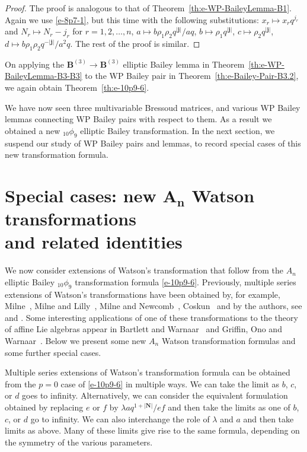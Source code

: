 \documentclass[pdftex]{sigma}
\numberwithin{equation}{section}
\newcommand{\sumN}{{\left| \boldsymbol{N} \right|}}
\newcommand\sumj{{\left| \boldsymbol {j} \right|}}
\newcommand{\B}{{ \mathbf B}}
\begin{document}
\begin{proof}
The proof is analogous to that of Theorem~\ref{th:e-WP-BaileyLemma-B1}. Again we use \eqref{e-8p7-1}, but this time with the following substitutions: $x_r\mapsto x_rq^{j_r}$ and $N_r\mapsto N_r-j_r$ for $r=1, 2, \dots, n$, $a\mapsto b\rho_1\rho_2q^{\sumj}/aq$, $b\mapsto \rho_1q^{\sumj}$, $c\mapsto \rho_2q^{\sumj}$, $d\mapsto b\rho_1\rho_2q^{-\sumj}/a^2q$. The rest of the proof is similar.
\end{proof}

On applying the $\B^{(3)} \to\B^{(3)}$ elliptic Bailey lemma in Theorem~\ref{th:e-WP-BaileyLemma-B3-B3} to the WP Bailey pair in Theorem~\ref{th:e-Bailey-Pair-B3.2}, we again obtain Theorem~\ref{th:e-10p9-6}.

We have now seen three multivariable Bressoud matrices, and various WP Bailey lemmas connecting WP Bailey pairs with respect to them. As a result we obtained a new $_{10}\phi_9$ elliptic Bailey transformation. In the next section, we suspend our study of WP Bailey pairs and lemmas, to record special cases of this new transformation formula.

\section[Special cases: new $A_n$ Watson transformations and related identities]{Special cases: new $\boldsymbol{A_n}$ Watson transformations\\ and related identities}\label{sec:piszero}

We now consider extensions of Watson's transformation that follow from the $A_n$ elliptic Bailey $_{10}\phi_9$ transformation formula \eqref{e-10p9-6}. Previously, multiple series extensions of Watson's transformations have been obtained by, for example, Milne~\cite{Milne1988, Milne1994, Milne2000}, Milne and Lilly~\cite{ML1995}, Milne and Newcomb~\cite{MN1996}, Coskun~\cite{HC2008} and by the authors, see \cite{GB1999a} and \cite{BS1998}. Some interesting applications of one of these transformations to the theory of affine Lie algebras appear in Bartlett and Warnaar~\cite{BW2015} and Griffin, Ono and Warnaar~\cite{GOW2016}.
Below we present some new $A_n$ Watson transformation formulas and some further special cases.

Multiple series extensions of Watson's transformation formula \cite[equation~(2.5.1)]{GR90} can be obtained from the $p=0$ case of \eqref{e-10p9-6} in multiple ways. We can take the limit as $b$, $c$, or $d$ goes to infinity. Alternatively, we can consider the equivalent formulation obtained by replacing $e$ or $f$ by $\lambda a q^{1+\sumN}/ef$ and then take the limits as one of $b$, $c$, or $d$ go to infinity. We can also interchange the role of $\lambda$ and $a$ and then take limits as above. Many of these limits give rise to the same formula, depending on the symmetry of the various parameters.
\end{document}
